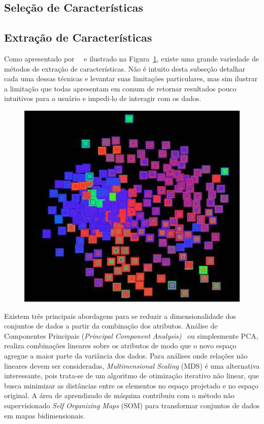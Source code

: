 \subsection{Seleção de Características}

\subsection{Extração de Características}

Como apresentado por~\citeauthor{Maaten2009}~\cite{Maaten2009} e ilustrado na Figura~\ref{fig:fex}, existe uma grande variedade de métodos de extração de características. Não é intuito desta subseção detalhar cada uma dessas técnicas e levantar suas limitações particulares, mas sim ilustrar a limitação que todas apresentam em comum de retornar resultados pouco intuitivos para o usuário e impedi-lo de interagir com os dados.

\begin{figure}[h!]
    \centering
    \includegraphics[width=\textwidth]{images/var1.png}
    \caption[]{}
    \label{fig:fex}
\end{figure}


Existem três principais abordagens para se reduzir a dimensionalidade dos conjuntos de dados a partir da combinação dos atributos. 
Análise de Componentes Principais (\textit{Principal Component Analysis)}~ ou simplesmente PCA, realiza combinações lineares sobre os atributos de modo que o novo espaço agregue a maior parte da variância dos dados. 
Para análises onde relações não lineares devem ser consideradas, \textit{Multimensional Scaling} (MDS) é uma alternativa interessante, pois trata-se de um algoritmo de otimização iterativo não linear, que busca minimizar as distâncias entre os elementos no espaço projetado e no espaço original. 
A área de aprendizado de máquina contribuiu com o método não supervisionado \textit{Self Organizing Maps} (SOM) para transformar conjuntos de dados em mapas bidimensionais.

